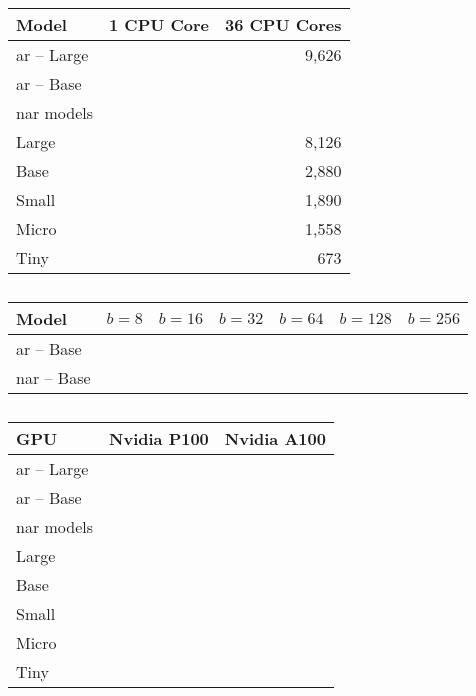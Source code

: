 \begin{table}
  \centering

  \begin{tabular}{lrr}
    \toprule
    Model & 1 CPU Core & 36 CPU Cores \\
    \midrule
    \acs{ar} -- Large & & 9,626 \\
    \acs{ar} -- Base & & \\
    \midrule
    \Acl{nar} models \\
    Large & & 8,126 \\
    Base  & & 2,880 \\
    Small & & 1,890 \\
    Micro & & 1,558 \\
    Tiny  & &   673 \\
    \bottomrule
  \end{tabular}

  \caption{}%
  \label{tab:}
\end{table}


\begin{table}
  \centering

  \begin{tabular}{l*{6}r}
    \toprule
    Model & $b=8$ & $b=16$ & $b=32$ & $b=64$ & $b=128$ & $b=256$ \\
    \midrule
    \acs{ar} -- Base \\
    \acs{nar} -- Base \\
    \bottomrule
  \end{tabular}

  \caption{}%
  \label{tab:}
\end{table}



\begin{table}
  \centering

  \begin{tabular}{lrr}
    \toprule
    GPU & Nvidia P100 & Nvidia A100 \\
    \midrule
    \acs{ar} -- Large & & \\
    \acs{ar} -- Base & & \\
    \midrule
    \Acl{nar} models \\
    Large & & \\
    Base  & & \\
    Small & & \\
    Micro & & \\
    Tiny  & & \\
    \bottomrule
  \end{tabular}

  \caption{}%
  \label{tab:}
\end{table}


